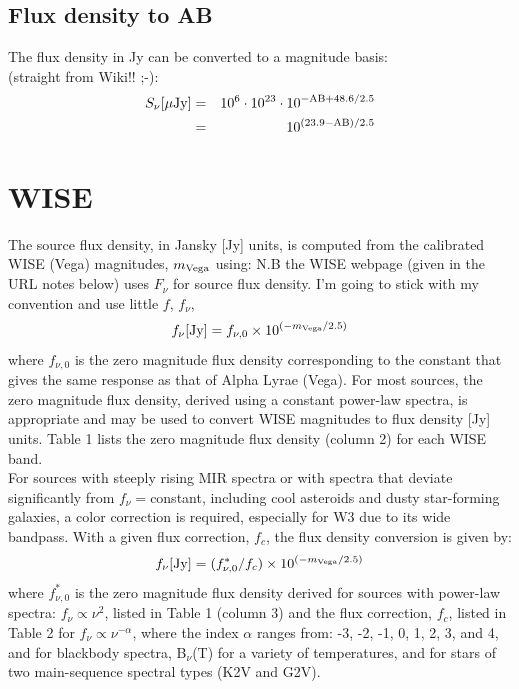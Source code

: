 \documentclass[11pt,a4paper]{article}
\begin{document}
    \subsection{Flux density to AB}
    The flux density in Jy can be converted to a magnitude basis:\\
    (straight from Wiki!! ;-):\\
    \begin{eqnarray}
      S_{\nu} [\mu {\rm Jy} ]  & = & 10^{6} \cdot 10^{23} \cdot 10^{-{{\rm AB} +48.6/2.5 }} \\
                                        & = & 10^{(23.9 - {\rm AB})/2.5} \\
    \end{eqnarray}




\section{WISE}
The source flux density, in Jansky [Jy] units, is computed from the calibrated WISE (Vega) magnitudes, $m_{\rm Vega}$ using:
N.B the WISE webpage (given in the URL notes below) uses $F_{\nu}$ for source flux density. I'm going to stick with my convention and use little $f$, $f_{\nu}$, 
\begin{equation}
  f_{\nu} [{\rm Jy}]  =  f_{\nu, 0} \times 10^{(-m_{\rm Vega}/2.5)} 
\end{equation}
where $f_{\nu, 0}$ is the zero magnitude flux density corresponding to the constant that gives the same response as that of Alpha Lyrae (Vega). For most sources, the zero magnitude flux density, derived using a constant power-law spectra, is appropriate and may be used to convert WISE magnitudes to flux density [Jy] units. Table 1 lists the zero magnitude flux density (column 2) for each WISE band.\\

\noindent
For sources with steeply rising MIR spectra or with spectra that deviate significantly from $f_{\nu}=$constant, including cool asteroids and dusty star-forming galaxies, a color correction is required, especially for W3 due to its wide bandpass. With a given flux correction, $f_{c}$, the flux density conversion is given by:
\begin{equation}
  f_{\nu} [{\rm Jy}]  = (f^{*}_{\nu, 0}/f_{c}) \times 10^{(-m_{\rm Vega}/2.5)} 
\end{equation}
where $f^{*}_{\nu, 0}$ is the zero magnitude flux density derived for sources with power-law spectra: $f_{\nu} \propto \nu^{2}$, listed in Table 1 (column 3) and the flux correction, $f_{c}$, listed in Table 2 for $f_{\nu} \propto \nu^{-\alpha}$, where the index $\alpha$  ranges from: -3, -2, -1, 0, 1, 2, 3, and 4, and for blackbody spectra, B$_{\nu}$(T) for a variety of temperatures, and for stars of two main-sequence spectral types (K2V and G2V). 
\end{document}
